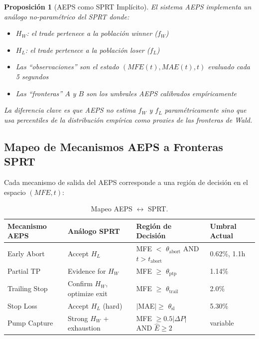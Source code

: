 \documentclass[11pt,a4paper]{article}
\newtheorem{proposition}{Proposici\'on}[section]
\newcommand{\exh}{\hat{E}}
\begin{document}
\begin{proposition}[AEPS como SPRT Impl\'icito]
\label{prop:sprt_analog}
El sistema AEPS implementa un an\'alogo no-param\'etrico del SPRT
donde:
\begin{itemize}[leftmargin=1.5em]
\item $H_W$: el trade pertenece a la poblaci\'on winner ($f_W$)
\item $H_L$: el trade pertenece a la poblaci\'on loser ($f_L$)
\item Las ``observaciones'' son el estado $(MFE(t), MAE(t), t)$
  evaluado cada 5 segundos
\item Las ``fronteras'' $A$ y $B$ son los umbrales AEPS calibrados
  emp\'iricamente
\end{itemize}
La diferencia clave es que AEPS no estima $f_W$ y $f_L$ param\'etricamente
sino que usa percentiles de la distribuci\'on emp\'irica como
proxies de las fronteras de Wald.
\end{proposition}

\subsection{Mapeo de Mecanismos AEPS a Fronteras SPRT}

Cada mecanismo de salida del AEPS corresponde a una regi\'on de
decisi\'on en el espacio $(MFE, t)$:

\begin{table}[H]
\centering
\caption{Mapeo AEPS $\leftrightarrow$ SPRT.}
\label{tab:sprt_mapping}
\begin{tabularx}{\textwidth}{llXl}
\toprule
\textbf{Mecanismo AEPS} & \textbf{An\'alogo SPRT} & \textbf{Regi\'on de Decisi\'on} & \textbf{Umbral Actual} \\
\midrule
Early Abort & Accept $H_L$ & MFE $<$ $\theta_{\text{abort}}$ AND $t > t_{\text{abort}}$ & 0.62\%, 1.1h \\
Partial TP & Evidence for $H_W$ & MFE $\geq$ $\theta_{\text{ptp}}$ & 1.14\% \\
Trailing Stop & Confirm $H_W$, optimize exit & MFE $\geq$ $\theta_{\text{trail}}$ & 2.0\% \\
Stop Loss & Accept $H_L$ (hard) & $|$MAE$| \geq$ $\theta_{\text{sl}}$ & 5.30\% \\
Pump Capture & Strong $H_W$ + exhaustion & MFE $\geq 0.5|\Delta P|$ AND $\exh \geq 2$ & variable \\
\bottomrule
\end{tabularx}
\end{table}
\end{document}
